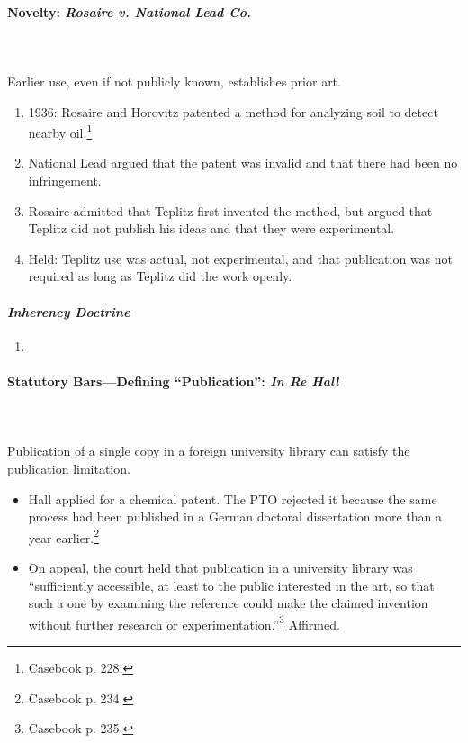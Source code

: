 \paragraph{Novelty: \emph{Rosaire v. National Lead Co.}}
~\\\\
Earlier use, even if not publicly known, establishes prior art.

\begin{enumerate}
    \item 1936: Rosaire and Horovitz patented a method for analyzing soil to 
    detect nearby oil.\footnote{Casebook p. 228.}
    \item National Lead argued that the patent was invalid and that there had 
    been no infringement.
    \item Rosaire admitted that Teplitz first invented the method, but argued 
    that Teplitz did not publish his ideas and that they were experimental.
    \item Held: Teplitz use was actual, not experimental, and that publication 
    was not required as long as Teplitz did the work openly.
\end{enumerate}

\paragraph{\emph{Inherency Doctrine}} %

\begin{enumerate}
    \item 
\end{enumerate}

\paragraph{Statutory Bars---Defining ``Publication'': \emph{In Re Hall}}
~\\\\
Publication of a single copy in a foreign university library can satisfy 
the publication limitation.

\begin{itemize}
    \item Hall applied for a chemical patent. The PTO rejected it because the 
    same process had been published in a German doctoral dissertation more than 
    a year earlier.\footnote{Casebook p. 234.}
    \item On appeal, the court held that publication in a university library was 
    ``sufficiently accessible, at least to the public interested in the art, so 
    that such a one by examining the reference could make the claimed invention 
    without further research or experimentation.''\footnote{Casebook p. 235.} 
    Affirmed.
\end{itemize}

